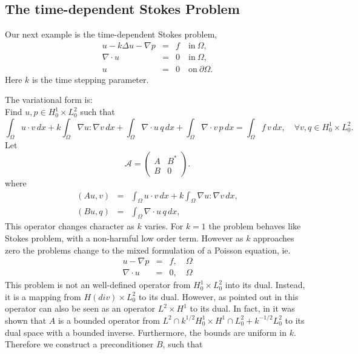 \subsection{The time-dependent Stokes Problem}
Our next example is the time-dependent Stokes problem,
\begin{eqnarray}
u - k \Delta u - \nabla p &=& f \quad \mbox{in} \ \Omega, \\ 
\nabla \cdot u &=& 0 \quad \mbox{in} \  \Omega, \\
             u &=& 0   \quad \mbox{on} \  \partial \Omega.  
\end{eqnarray}
Here $k$ is the time stepping parameter. 

The variational form is: \\ 
Find $u,p \in H^1_0 \times L_0^2$ such that  
\[
\int_\Omega u \cdot v \,  dx + 
k \int_\Omega \nabla u : \nabla v \,  dx + 
\int_\Omega \nabla \cdot u \, q \,  dx +  
\int_\Omega \nabla \cdot v \, p \,  dx = \int_\Omega f\, v\, dx   , \quad \forall v,q \in H^1_0 \times L_0^2.
\]
Let 
\[
\mathcal{A}  =
\begin{pmatrix} A & B^* \\ B & 0 \end{pmatrix}.
\]
where 
\begin{eqnarray}
(A u, v) &=& \int_\Omega u \cdot v \,  dx +  k \int_\Omega \nabla u : \nabla v \,  dx, \\  
(B u, q) &=& \int_\Omega \nabla \cdot u \, q \,  dx,    
\end{eqnarray}
This operator changes character as $k$ varies.  
For $k=1$ the problem behaves like Stokes problem, with 
a non-harmful low order term. However as $k$ approaches
zero the problems change to the mixed formulation of 
a Poisson equation, ie. 
\begin{eqnarray}
u - \nabla p &=& f, \quad \Omega \\
\nabla \cdot u  &=& 0, \quad \Omega
\end{eqnarray}
This problem is not an well-defined operator from 
$H^1_0 \times L_0^2$ into its dual. Instead, it
is a mapping from $H(div) \times L_0^2$  to its dual. 
However, as pointed out in \citep{MardalWinther2004} this operator
can also be seen as an operator $L^2 \times H^1$ to its dual.  
In fact, in \citep{MardalTaiWinther2002a,MardalWinther2004} it was shown that 
 $A$ is a bounded operator from
$L^2 \cap k^{1/2} H^1_0 \times H^1 \cap L_0^2 + k^{-1/2} L_0^2$ to its dual space
with a bounded inverse. Furthermore, the bounds are uniform in $k$. 
Therefore we 
construct a preconditioner $B$, such that  
